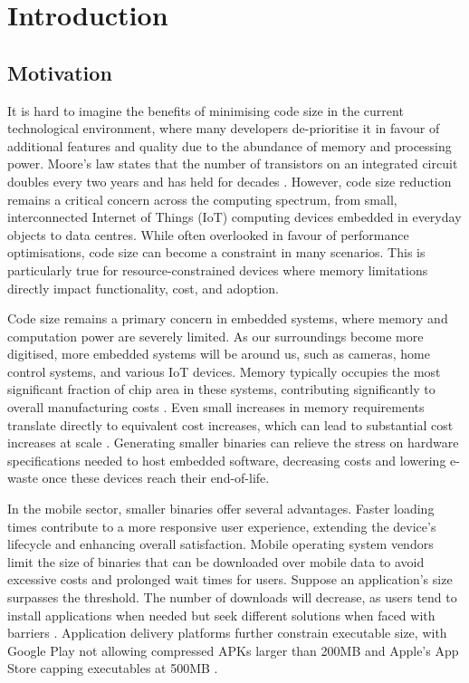 \chapter{Introduction} \label{cha:intro}
\section{Motivation}
It is hard to imagine the benefits of minimising code size in the current technological environment, where many developers de-prioritise it in favour of additional features and quality due to the abundance of memory and processing power. Moore's law states that the number of transistors on an integrated circuit doubles every two years and has held for decades \cite{MooresLaw}. However, code size reduction remains a critical concern across the computing spectrum, from small, interconnected Internet of Things (IoT) computing devices embedded in everyday objects to data centres. While often overlooked in favour of performance optimisations, code size can become a constraint in many scenarios. This is particularly true for resource-constrained devices where memory limitations directly impact functionality, cost, and adoption.

Code size remains a primary concern in embedded systems, where memory and computation power are severely limited. As our surroundings become more digitised, more embedded systems will be around us, such as cameras, home control systems, and various IoT devices. Memory typically occupies the most significant fraction of chip area in these systems, contributing significantly to overall manufacturing costs \cite{EmbeddedSystemMemoryArea}. Even small increases in memory requirements translate directly to equivalent cost increases, which can lead to substantial cost increases at scale \cite{EmbeddedSystemMemoryCost}. Generating smaller binaries can relieve the stress on hardware specifications needed to host embedded software, decreasing costs and lowering e-waste once these devices reach their end-of-life.

In the mobile sector, smaller binaries offer several advantages. Faster loading times contribute to a more responsive user experience, extending the device's lifecycle and enhancing overall satisfaction. Mobile operating system vendors limit the size of binaries that can be downloaded over mobile data to avoid excessive costs and prolonged wait times for users. Suppose an application's size surpasses the threshold. The number of downloads will decrease, as users tend to install applications when needed but seek different solutions when faced with barriers \cite{UberBinarySize}. Application delivery platforms further constrain executable size, with Google Play not allowing compressed APKs larger than 200MB and Apple's App Store capping executables at 500MB \cite{GoogleBuildSize}\cite{AppleBuildSize}.

